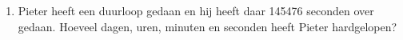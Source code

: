 \begin{enumerate}
	\item Pieter heeft een duurloop gedaan en hij heeft daar 145476 seconden over gedaan. Hoeveel dagen, uren, minuten en seconden heeft Pieter hardgelopen?
\end{enumerate}
